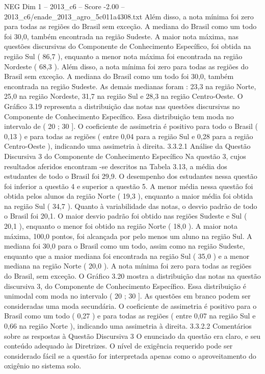 \begin{textsample}{NEG Dim 1 – 2013\_c6 – Score -2.00 – 2013\_c6/enade\_2013\_agro\_5c011a4308.txt}
Além disso, a nota mínima foi zero para todas as regiões do Brasil sem exceção.
A mediana do Brasil como um todo foi 30,0, também encontrada na região Sudeste.
A maior nota máxima, nas questões discursivas do Componente de Conhecimento Específico, foi obtida na região Sul ( 86,7 ), enquanto a menor nota máxima foi encontrada na região Nordeste ( 68,3 ).
Além disso, a nota mínima foi zero para todas as regiões do Brasil sem exceção.
A mediana do Brasil como um todo foi 30,0, também encontrada na região Sudeste.
As demais medianas foram : 23,3 na região Norte, 25,0 na região Nordeste, 31,7 na região Sul e 28,3 na região Centro-Oeste.
O Gráfico 3.19 representa a distribuição das notas nas questões discursivas no Componente de Conhecimento Específico.
Essa distribuição tem moda no intervalo de ( 20 ; 30 ].
O coeficiente de assimetria é positivo para todo o Brasil ( 0,13 ) e para todas as regiões ( entre 0,04 para a região Sul e 0,28 para a região Centro-Oeste ), indicando uma assimetria à direita. 3.3.2.1 Análise da Questão Discursiva 3 do Componente de Conhecimento Específico Na questão 3, cujos resultados aferidos encontram -se descritos na Tabela 3.13, a média dos estudantes de todo o Brasil foi 29,9.
O desempenho dos estudantes nessa questão foi inferior a questão 4 e superior a questão 5.
A menor média nessa questão foi obtida pelos alunos da região Norte ( 19,3 ), enquanto a maior média foi obtida na região Sul ( 34,7 ).
Quanto à variabilidade das notas, o desvio padrão de todo o Brasil foi 20,1.
O maior desvio padrão foi obtido nas regiões Sudeste e Sul ( 20,1 ), enquanto o menor foi obtido na região Norte ( 18,0 ).
A maior nota máxima, 100,0 pontos, foi alcançada por pelo menos um aluno na região Sul.
A mediana foi 30,0 para o Brasil como um todo, assim como na região Sudeste, enquanto que a maior mediana foi encontrada na região Sul ( 35,0 ) e a menor mediana na região Norte ( 20,0 ).
A nota mínima foi zero para todas as regiões do Brasil, sem exceção.
O Gráfico 3.20 mostra a distribuição das notas na questão discursiva 3, do Componente de Conhecimento Específico.
Essa distribuição é unimodal com moda no intervalo ( 20 ; 30 ].
As questões em branco podem ser consideradas uma moda secundária.
O coeficiente de assimetria é positivo para o Brasil como um todo ( 0,27 ) e para todas as regiões ( entre 0,07 na região Sul e 0,66 na região Norte ), indicando uma assimetria à direita. 3.3.2.2 Comentários sobre as respostas à Questão Discursiva 3 O enunciado da questão era claro, e seu conteúdo adequado às Diretrizes.
O nível de exigência requerido pode ser considerado fácil se a questão for interpretada apenas como o aproveitamento do oxigênio no sistema solo.

\end{textsample}
